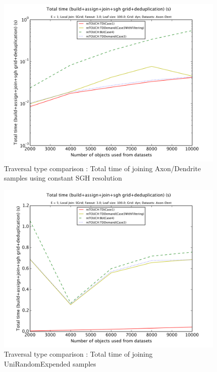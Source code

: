 \documentclass{sig-alternate}
\begin{document}
\begin{figure}[htb]
    \begin{center}
        \includegraphics[width=\columnwidth]{traversalTypeWithConstantGridFixed/total}
        \caption{Traversal type comparison : Total time of joining Axon/Dendrite samples using constant SGH resolution}
        \label{fig:traversal:totalconst}
      \end{center}
\end{figure}

\begin{figure}[htb]
    \begin{center}
        \includegraphics[width=\columnwidth]{traveralTypeRandomSizeConstantGrid/total}
        \caption{Traversal type comparison : Total time of joining UniRandomExpended samples}
        \label{fig:traversal:totalrand}
      \end{center}
\end{figure}
\end{document}
